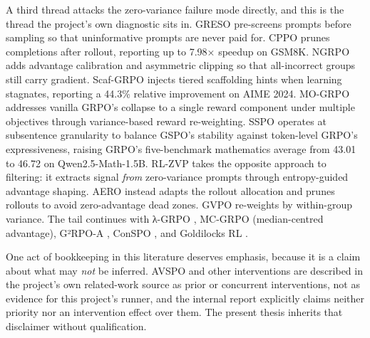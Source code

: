 \documentclass[12pt,a4paper]{report}
\begin{document}
A third thread attacks the zero-variance failure mode directly, and this
is the thread the project's own diagnostic sits in. GRESO
\citep{zheng2025greso} pre-screens prompts before sampling so that
uninformative prompts are never paid for. CPPO \citep{lin2025cppo}
prunes completions after rollout, reporting up to 7.98× speedup on
GSM8K. NGRPO \citep{nan2025ngrpo} adds advantage calibration and
asymmetric clipping so that all-incorrect groups still carry gradient.
Scaf-GRPO \citep{zhang2025scafgrpo} injects tiered scaffolding hints
when learning stagnates, reporting a 44.3\% relative improvement on AIME
2024. MO-GRPO \citep{ichihara2025mogrpo} addresses vanilla GRPO's
collapse to a single reward component under multiple objectives through
variance-based reward re-weighting. SSPO \citep{yang2025sspo} operates
at subsentence granularity to balance GSPO's stability against
token-level GRPO's expressiveness, raising GRPO's five-benchmark
mathematics average from 43.01 to 46.72 on Qwen2.5-Math-1.5B. RL-ZVP
\citep{le2025rlzvp} takes the opposite approach to filtering: it
extracts signal \emph{from} zero-variance prompts through entropy-guided
advantage shaping. AERO \citep{zhang2026aero} instead adapts the rollout
allocation and prunes rollouts to avoid zero-advantage dead zones. GVPO
\citep{zhang2025gvpo} re-weights by within-group variance. The tail
continues with λ-GRPO \citep{wang2025lambdagrpo}, MC-GRPO
\citep{kim2026mcgrpo} (median-centred advantage), G²RPO-A
\citep{guo2025g2rpoa}, ConSPO \citep{zhang2026conspo}, and Goldilocks RL
\citep{mahrooghi2026goldilocks}.

One act of bookkeeping in this literature deserves emphasis, because it
is a claim about what may \emph{not} be inferred. AVSPO
\citep{he2026avspo} and other interventions are described in the
project's own related-work source as prior or concurrent interventions,
not as evidence for this project's runner, and the internal report
explicitly claims neither priority nor an intervention effect over them.
The present thesis inherits that disclaimer without qualification.
\end{document}
